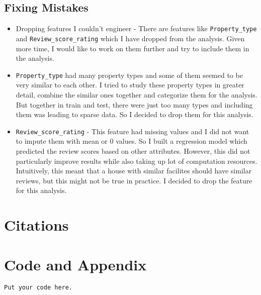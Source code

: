 \documentclass[12pt]{article}
\theoremstyle{definition}
\begin{document}
\subsection{Fixing Mistakes}
\begin{itemize}
    \item Dropping features I couldn't engineer - There are features like \texttt{Property\_type} and \texttt{Review\_score\_rating} which I have dropped from the analysis. Given more time, I would like to work on them further and try to include them in the analysis.
    \item \texttt{Property\_type} had many property types and some of them seemed to be very similar to each other. I tried to study these property types in greater detail, combine the similar ones together and categorize them for the analysis. But together in train and test, there were just too many types and including them was leading to sparse data. So I decided to drop them for this analysis.
    \item \texttt{Review\_score\_rating} - This feature had missing values and I did not want to impute them with mean or 0 values. So I built a regression model which predicted the review scores based on other attributes. However, this did not particularly improve results while also taking up lot of computation resources. Intuitively, this meant that a house with similar facilites should have similar reviews, but this might not be true in practice. I decided to drop the feature for this analysis.
\end{itemize}
\section*{Citations}

\section*{Code and Appendix}
\begin{lstlisting}
Put your code here.
\end{lstlisting}
\end{document}

